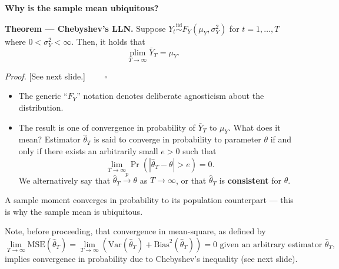 \documentclass[
  letterpaper,
  DIV=11,
  numbers=noendperiod]{scrartcl}
\newcommand{\slidelabel}[1]{{\color{embernavy}\bfseries\large #1\par\vspace{5pt}}}
\newenvironment{slidefooter}{%
  \par\vspace{7pt}{\color{emberrule}\rule{\linewidth}{0.4pt}}\par\vspace{4pt}%
  \color{emberamber}\itshape\small}{\par}
\begin{document}
\begin{slidebox}

\slidelabel{Why is the sample mean ubiquitous?}

\textbf{Theorem --- Chebyshev's LLN.} Suppose
\(Y_t \overset{\scriptscriptstyle\text{iid}}{\sim} F_Y(\mu_Y, \sigma_Y^2)\)
for \(t = 1,\ldots,T\) where \(0 < \sigma_Y^2 < \infty\). Then, it holds
that \[\operatorname*{plim}_{T\to\infty}\bar{Y}_T = \mu_Y.\]

\emph{Proof.} {[}See next slide.{]} \(\qquad\square\)

\begin{itemize}
\item
  The generic ``\(F_Y\)'' notation denotes deliberate agnosticism about
  the distribution.
\item
  The result is one of convergence in probability of \(\bar{Y}_T\) to
  \(\mu_Y\). What does it mean? Estimator \(\hat{\theta}_T\) is said to
  converge in probability to parameter \(\theta\) if and only if there
  exists an arbitrarily small \(e > 0\) such that
  \[\lim_{T\to\infty} \Pr\!\left(\left|\hat{\theta}_T - \theta\right| > e\right) = 0.\]
  We alternatively say that \(\hat{\theta}_T \overset{p}{\to} \theta\)
  as \(T \to \infty\), or that \(\hat{\theta}_T\) is \textbf{consistent}
  for \(\theta\).
\end{itemize}

\begin{slidefooter}

A sample moment converges in probability to its population counterpart
--- this is why the sample mean is ubiquitous.

\end{slidefooter}

\end{slidebox}

Note, before proceeding, that convergence in mean-square, as defined by
\[\lim_{T\to\infty} \text{MSE}(\hat{\theta}_T) = \lim_{T\to\infty}\left(\text{Var}(\hat{\theta}_T) + \text{Bias}^2(\hat{\theta}_T)\right) = 0 \text{ given an arbitrary estimator } \hat{\theta}_T,\]
implies convergence in probability due to Chebyshev's inequality (see
next slide).
\end{document}
